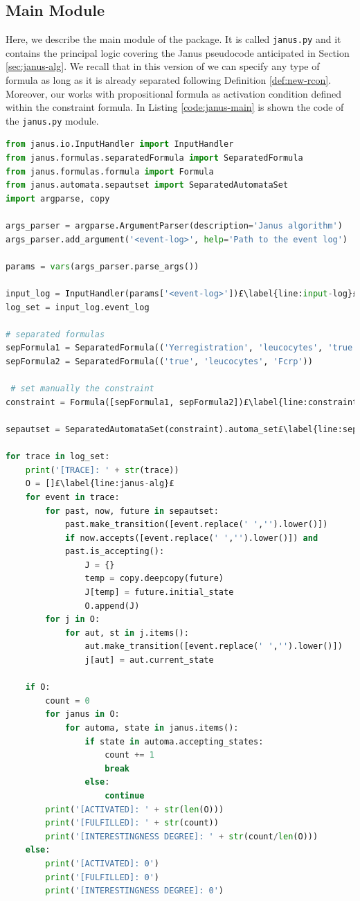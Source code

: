 \subsection{Main Module}\label{sec:janus-main}
Here, we describe the main module of the \janus package. It is called \texttt{janus.py} and it contains the principal logic covering the Janus pseudocode anticipated in Section \ref{sec:janus-alg}. We recall that in this version of \janus we can specify any type of \LTLp formula as long as it is already separated following Definition \ref{def:new-rcon}. Moreover, our \janus works with propositional formula as activation condition defined within the constraint formula. In Listing \ref{code:janus-main} is shown the code of the \texttt{janus.py} module.
\begin{lstlisting}[language=Python, style=Python, escapechar = £, label={code:janus-main}, caption={The \texttt{janus.py} module}]
from janus.io.InputHandler import InputHandler
from janus.formulas.separatedFormula import SeparatedFormula
from janus.formulas.formula import Formula
from janus.automata.sepautset import SeparatedAutomataSet
import argparse, copy

args_parser = argparse.ArgumentParser(description='Janus algorithm')
args_parser.add_argument('<event-log>', help='Path to the event log')

params = vars(args_parser.parse_args())

input_log = InputHandler(params['<event-log>'])£\label{line:input-log}£
log_set = input_log.event_log

# separated formulas
sepFormula1 = SeparatedFormula(('Yerregistration', 'leucocytes', 'true'))£\label{line:sep-formulas}£
sepFormula2 = SeparatedFormula(('true', 'leucocytes', 'Fcrp'))

 # set manually the constraint
constraint = Formula([sepFormula1, sepFormula2])£\label{line:constraint}£

sepautset = SeparatedAutomataSet(constraint).automa_set£\label{line:sep-aut-set}£

for trace in log_set:
    print('[TRACE]: ' + str(trace))
    O = []£\label{line:janus-alg}£
    for event in trace:
        for past, now, future in sepautset:
            past.make_transition([event.replace(' ','').lower()])
            if now.accepts([event.replace(' ','').lower()]) and 
            past.is_accepting():
                J = {}
                temp = copy.deepcopy(future)
                J[temp] = future.initial_state
                O.append(J)
        for j in O:
            for aut, st in j.items():
                aut.make_transition([event.replace(' ','').lower()])
                j[aut] = aut.current_state

    if O:
        count = 0
        for janus in O:
            for automa, state in janus.items():
                if state in automa.accepting_states:
                    count += 1
                    break
                else:
                    continue
        print('[ACTIVATED]: ' + str(len(O)))
        print('[FULFILLED]: ' + str(count))
        print('[INTERESTINGNESS DEGREE]: ' + str(count/len(O)))
    else:
        print('[ACTIVATED]: 0')
        print('[FULFILLED]: 0')
        print('[INTERESTINGNESS DEGREE]: 0')
\end{lstlisting}
